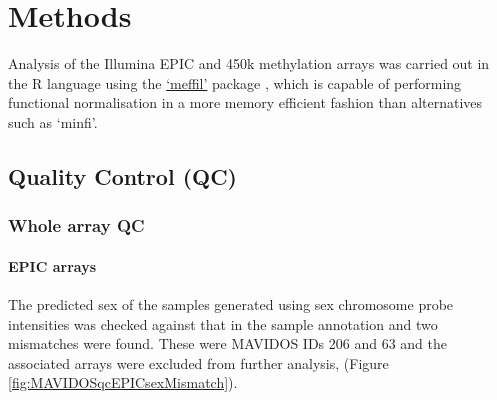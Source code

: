\documentclass[]{book}
\let\oldparagraph\paragraph
\renewcommand{\paragraph}[1]{\oldparagraph{#1}\mbox{}}
\begin{document}
\hypertarget{methods-1}{%
\section{Methods}\label{methods-1}}

Analysis of the Illumina EPIC and 450k methylation arrays was carried out in the R language using the \href{https://github.com/perishky/meffil/wiki}{`meffil'} package \citep{Min2017}, which is capable of performing functional normalisation in a more memory efficient fashion than alternatives such as `minfi'.

\hypertarget{quality-control-qc}{%
\subsection{Quality Control (QC)}\label{quality-control-qc}}

\hypertarget{whole-array-qc}{%
\subsubsection{Whole array QC}\label{whole-array-qc}}

\hypertarget{epic-arrays}{%
\paragraph{EPIC arrays}\label{epic-arrays}}

The predicted sex of the samples generated using sex chromosome probe intensities was checked against that in the sample annotation and two mismatches were found. These were MAVIDOS IDs 206 and 63 and the associated arrays were excluded from further analysis, (Figure \ref{fig:MAVIDOSqcEPICsexMismatch}).
\end{document}
